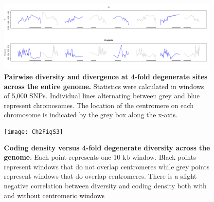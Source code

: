 \begin{figure}[ht!]
      \centering
       \includegraphics[width=\linewidth]{Ch2FigS2.pdf}
    \caption{\textbf{Pairwise diversity and divergence at 4-fold degenerate sites across the entire genome.} Statistics were calculated in windows of 5,000 SNPs. Individual lines alternating between grey and blue represent chromosomes. The location of the centromere on each chromosome is indicated by the grey box along the x-axis.}
    \label{fig:figS2}
\end{figure}

\begin{figure}[ht!]
      \centering
       \texttt{[image: Ch2FigS3]}
    \caption{\textbf{Coding density versus 4-fold degenerate diversity across the genome.} Each point represents one 10 kb window. Black points represent windows that do not overlap centromeres while grey points represent windows that do overlap centromeres. There is a slight negative correlation between diversity and coding density both with and without centromeric windows}
    \label{fig:figS3}
\end{figure}

